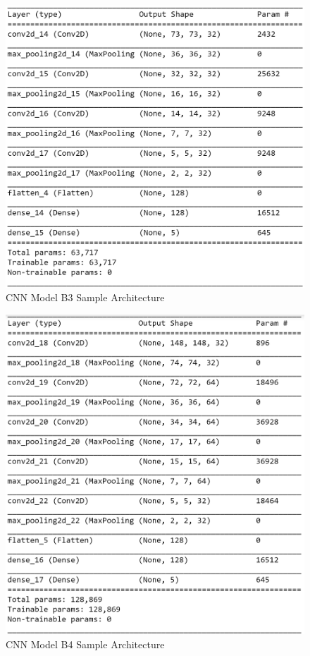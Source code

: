 \documentclass[letterpaper, 12 pt, conference]{ieeeconf}  %
\begin{document}
\begin{figure}[!h]
\centering
\includegraphics[scale=0.60]{../figs/model_arch/cnn_b3.png}	
\caption{CNN Model B3 Sample Architecture}
\label{fig:CNN_B3_Arch_Model} 
\end{figure}

\begin{figure}[!h]
\centering
\includegraphics[scale=0.60]{../figs/model_arch/cnn_b4.png}	
\caption{CNN Model B4 Sample Architecture}
\label{fig:CNN_B4_Arch_Model} 
\end{figure}

\end{document}
